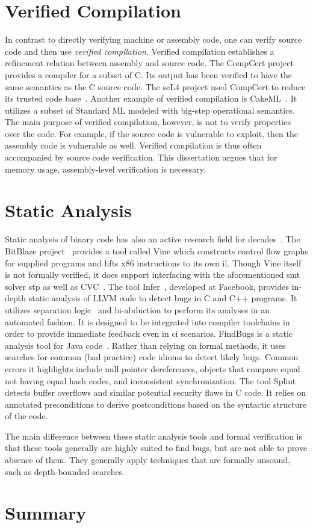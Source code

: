 \section{Verified Compilation}\label{se:verified}
In contrast to directly verifying machine or assembly code,
one can verify source code and then use \emph{verified compilation}.%
Verified compilation establishes a refinement relation between assembly and source code.
The CompCert project~\citep{leroy:compcert} provides a compiler for a subset of C.
Its output has been verified to have the same semantics as the C source code.
The seL4 project used CompCert to reduce its trusted code base~\citep{Klein_AEMSKH_14}.
Another example of verified compilation is CakeML~\citep{kumar2014cakeml}.
It utilizes a subset of Standard ML modeled with big-step operational semantics.
The main purpose of verified compilation, however,
is not to verify properties over the code.
For example, if the source code is vulnerable to  exploit,
then the assembly code is vulnerable as well.
Verified compilation is thus often accompanied by source code verification.
This dissertation argues that for memory usage, assembly-level verification is necessary.

\section{Static Analysis}\label{se:static_analysis}
Static analysis of binary code has also an active research field
for decades~\cite{kruegel2005automating,brumley2011bap,wang2017angr}.
The BitBlaze project~\citep{song2008bitblaze}
provides a tool called Vine which constructs control flow graphs
for supplied programs and lifts x86 instructions to its own \ac{il}.
Though Vine itself is not formally verified,
it does support interfacing with the aforementioned \ac{smt} solver \ac{stp}
as well as CVC~\citep{barrett2004cvcl,barrett2007cvc3}.
The tool Infer~\citep{calcagno2011infer}, developed at Facebook,
provides in-depth static analysis of LLVM code to detect bugs in C and C++ programs.
It utilizes separation logic~\citep{reynolds2002separation}
and bi-abduction to perform its analyses in an automated fashion.
It is designed to be integrated into compiler toolchains
in order to provide immediate feedback even in \ac{ci} scenarios.
FindBugs is a static analysis tool for Java code~\citep{hovemeyer2004findbugs}.
Rather than relying on formal methods,
it uses searches for common (bad practice) code idioms to detect likely bugs.
Common errors it highlights include null pointer dereferences,
objects that compare equal not having equal hash codes,
and inconsistent synchronization.
The tool Splint~\citep{evans2002static} detects buffer overflows
and similar potential security flaws in C code.
It relies on annotated preconditions to derive postconditions
based on the syntactic structure of the code.

The main difference between these static analysis tools and formal verification
is that these tools generally are highly suited to find bugs,
but are not able to prove absence of them.
They generally apply techniques that are formally unsound, such as depth-bounded searches.

\section{Summary}
